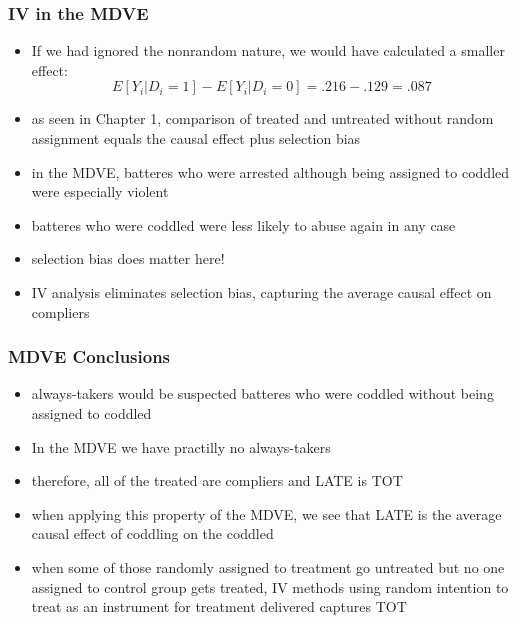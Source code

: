 \documentclass{beamer}
\begin{document}
\begin{frame}
\frametitle{IV in the MDVE}
\begin{itemize}
\item If we had ignored the nonrandom nature, we would have calculated a smaller effect:
$$E[Y_i|D_i=1]-E[Y_i|D_i=0] = .216 - .129 = .087$$
\item as seen in Chapter 1, comparison of treated and untreated without random assignment equals the causal effect plus selection bias
\item in the MDVE, batteres who were arrested although being assigned to coddled were especially violent
\item batteres who were coddled were less likely to abuse again in any case
\item selection bias does matter here!
\item IV analysis eliminates selection bias, capturing the average causal effect on compliers

\end{itemize}

\end{frame}
\begin{frame}
\frametitle{MDVE Conclusions}
\begin{itemize}
\item always-takers would be suspected batteres who were coddled without being assigned to coddled
\item In the MDVE we have practilly no always-takers 
\item therefore, all of the treated are compliers and LATE is TOT
\item when applying this property of the MDVE, we see that LATE is the average causal effect of coddling on the coddled
\item when some of those randomly assigned to treatment go untreated but no one assigned to control group gets treated, IV methods using random intention to treat as an instrument for treatment delivered captures TOT

\end{itemize}

\end{frame}



\end{document}
